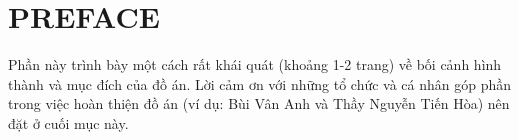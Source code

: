 \section*{PREFACE}
\thispagestyle{empty}
Phần này trình bày một cách rất khái quát (khoảng 1-2 trang) về bối cảnh hình thành và mục đích của đồ án. Lời cảm ơn với những tổ chức và cá nhân góp phần trong việc hoàn thiện đồ án (ví dụ: Bùi Vân Anh và Thầy Nguyễn Tiến Hòa) nên đặt ở cuối mục này.
\cleardoublepage